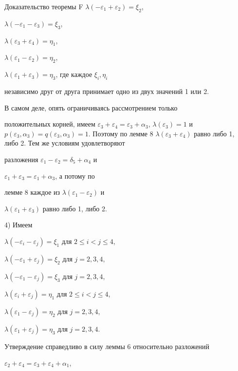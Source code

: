 \begin{pf*}{Доказательство теоремы F}
$\lambda(-\varepsilon_1+\varepsilon_2)=\xi_2$,


$\lambda(-\varepsilon_1-\varepsilon_3)=\xi_3$,


$\lambda(\varepsilon_3+\varepsilon_4)=\eta_1$,


$\lambda(\varepsilon_1-\varepsilon_2)=\eta_2$,


$\lambda(\varepsilon_1+\varepsilon_3)=\eta_3$, где каждое $\xi_i,\eta_i$


независимо друг от друга принимает одно из двух значений 1 или 2.





В самом деле, опять ограничиваясь рассмотрением только


положительных корней, имеем $\varepsilon_3+\varepsilon_4=\varepsilon_3+


\alpha_3$, $\lambda(\varepsilon_3)=1$ и $p(\varepsilon_3,\alpha_3)=


q(\varepsilon_3,\alpha_3)=1$. Поэтому по лемме 8 $\lambda(\varepsilon_3


+\varepsilon_4)$ равно либо 1, либо 2. Тем же условиям удовлетворяют


разложения $\varepsilon_1-\varepsilon_2=\delta_5+\alpha_4$ и


$\varepsilon_1+\varepsilon_3=\varepsilon_1+\alpha_3$, а потому по


лемме 8 каждое из $\lambda(\varepsilon_1-\varepsilon_2)$ и


$\lambda(\varepsilon_1+\varepsilon_3)$ равно либо 1, либо 2.





4)  Имеем


$\lambda(-\varepsilon_i-\varepsilon_j)=\xi_1$ для $2\le i<j\le 4$,


$\lambda(-\varepsilon_1+\varepsilon_j)=\xi_2$  для $j=2,3,4$,


$\lambda(-\varepsilon_1-\varepsilon_j)=\xi_3$  для  $j=2,3,4$,


$\lambda(\varepsilon_i+\varepsilon_j)=\eta_1$ для $2\le i<j\le 4$,


$\lambda(\varepsilon_1-\varepsilon_j)=\eta_2$  для $j=2,3,4$,


$\lambda(\varepsilon_1+\varepsilon_j)=\eta_3$  для  $j=2,3,4$.





Утверждение справедливо в силу леммы 6 относительно разложений


$\varepsilon_2+\varepsilon_4=\varepsilon_3+\varepsilon_4+\alpha_1$,



\end{pf*}
